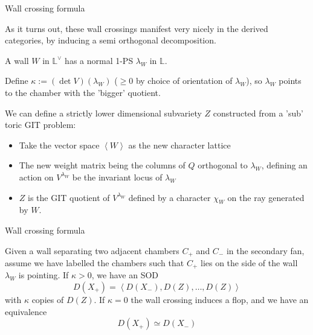\documentclass{beamer}
\begin{document}
\begin{frame}{Wall crossing formula}
    
    As it turns out, these wall crossings manifest very nicely in the derived categories, by inducing a semi orthogonal decomposition.
    \vspace{0.3cm}

    A wall $W$ in $\mathbb{L}^\vee$ has a normal 1-PS $\lambda_W$ in $\mathbb{L}$. 

    \vspace{0.3cm}

    Define $\kappa := (\det V)(\lambda_W) $ ($\geq 0$ by choice of orientation of $\lambda_W$), so $\lambda_W$ points to the chamber with the 'bigger' quotient.

    \vspace{0.3cm}
    We can define  a strictly lower dimensional subvariety $Z$ constructed from a 'sub' toric GIT problem: %

\begin{itemize}
    \item  Take the vector space $\left< W \right>$ as the new character lattice

    \item The new weight matrix being the columns of $Q$ orthogonal to $\lambda_W$, defining an action on $V^{\lambda_{W}}$ be the invariant locus of $\lambda_W$

    \item $Z$ is the GIT quotient of $V^{\lambda_{W}}$ defined by a character $\chi_W$ on the ray generated by $W$. 
\end{itemize}

\end{frame}



\begin{frame}{Wall crossing formula}

\begin{theorem}
    Given a wall separating two adjacent chambers $C_+$ and $C_-$ in the secondary fan, assume we have labelled the chambers such that $C_+$ lies on the side of the wall $\lambda_W$ is pointing. 
If $\kappa >0$, we have an SOD $$
D(X_{+})= \left< D(X_{-}), D(Z),\dots,D(Z) \right> 
$$with $\kappa$ copies of $D(Z)$.
If $\kappa=0$ the wall crossing induces a flop, and we have an equivalence $$
D(X_{+})\simeq D(X_{-})
$$
\end{theorem}
    
\end{frame}
\end{document}
